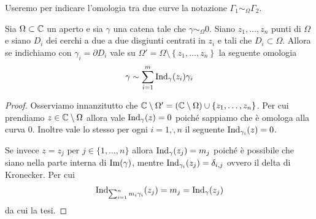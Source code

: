 \begin{remark}
  Useremo per indicare l'omologia tra due curve la notazione
  $\Gamma_1 \sim_\Omega \Gamma_2$.
  \label{rmk:notazione-omologia-catene}
\end{remark}

\begin{proposition}
    \label{prop:decomposizione-curva-in-catena-con-n-punti}
    Sia $\Omega \subset \mathbb{C}$ un aperto e sia $\gamma$ una catena tale che
    $\gamma \sim_\Omega 0$. Siano $z_1, \dots, z_n$ punti di $\Omega$
    e siano $D_i$ dei cerchi a due a due disgiunti centrati in $z_i$ e tali
    che $D_i \subset \Omega$. Allora se indichiamo con $\gamma_i = \partial
    D_i$ vale su $\Omega' = \Omega \setminus \left\{z_1,\dots, z_n\right\}$ la
    seguente omologia
    \begin{equation*}
      \gamma \sim \sum^m_{i=1} \operatorname{Ind}_\gamma(z_i) \gamma_i
    \end{equation*}
\end{proposition}
\begin{proof}
     Osserviamo innanzitutto che $\mathbb{C} \setminus \Omega' = (\mathbb{C} \setminus
     \Omega) \cup \{z_1, \dots, z_n\}$. Per cui prendiamo $z\in \mathbb{C} \setminus
     \Omega$ allora vale $\operatorname{Ind}_\gamma(z) = 0$ poiché sappiamo
     che è omologa alla curva $0$. Inoltre vale lo stesso per ogni $i
     = 1,\dot, n$ il seguente $\operatorname{Ind}_{\gamma_i}(z) = 0$. 

     Se invece $z = z_j$ per $j \in \{1, \dots, n\}$ allora
     $\operatorname{Ind}_\gamma(z_j) = m_j$ poiché è possibile che siano 
     nella parte interna di $\operatorname{Im}(\gamma)$, mentre
     $\operatorname{Ind}_{\gamma_i}(z_j) = \delta_{i,j}$ ovvero il delta di
     Kronecker. Per cui 
     \begin{equation*}
       \operatorname{Ind}_{\sum^n_{i=1} m_i \gamma_i}(z_j) = m_j
       = \operatorname{Ind}_\gamma(z_j) 
     \end{equation*}
    da cui la tesi.
 \end{proof}

